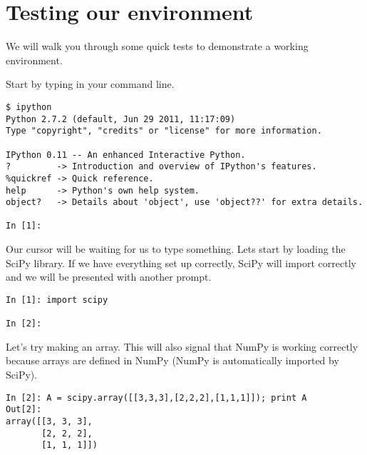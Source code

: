 \section*{Testing our environment}
We will walk you through some quick tests to demonstrate a working environment.

Start by typing  in your command line.
\begin{lstlisting}
$ ipython
Python 2.7.2 (default, Jun 29 2011, 11:17:09) 
Type "copyright", "credits" or "license" for more information.

IPython 0.11 -- An enhanced Interactive Python.
?         -> Introduction and overview of IPython's features.
%quickref -> Quick reference.
help      -> Python's own help system.
object?   -> Details about 'object', use 'object??' for extra details.

In [1]: 
\end{lstlisting}

Our cursor will be waiting for us to type something.  Lets start by loading the SciPy library.  If we have everything set up correctly, SciPy will import correctly and we will be presented with another prompt.
\begin{lstlisting}[style=python]
In [1]: import scipy

In [2]:
\end{lstlisting}

Let's try making an array.  This will also signal that NumPy is working correctly because arrays are defined in NumPy (NumPy is automatically imported by SciPy).
\begin{lstlisting}[style=python]
In [2]: A = scipy.array([[3,3,3],[2,2,2],[1,1,1]]); print A
Out[2]:
array([[3, 3, 3],
       [2, 2, 2],
       [1, 1, 1]])
\end{lstlisting}

